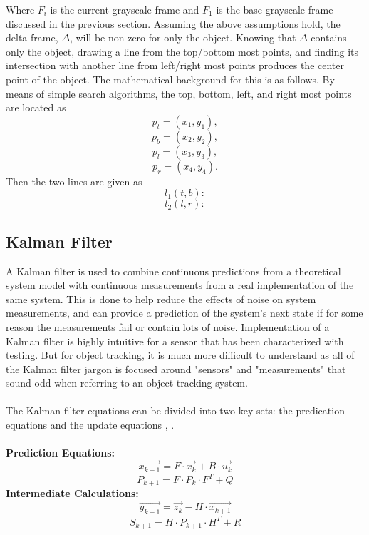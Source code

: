 \documentclass[12pt]{article} %
\begin{document}
Where $F_i$ is the current grayscale frame and $F_1$ is the base grayscale frame discussed in the previous section. Assuming the above assumptions hold, the delta frame, $\Delta$, will be non-zero for only the object. Knowing that $\Delta$ contains only the object, drawing a line from the top/bottom most points, and finding its intersection with another line from left/right most points produces the center point of the object. The mathematical background for this is as follows. By means of simple search algorithms, the top, bottom, left, and right most points are located as
\[
p_t = (x_1, y_1) ,
\]
\[
p_b = (x_2, y_2) ,
\]
\[
p_l = (x_3, y_3) ,
\]
\[
p_r = (x_4, y_4) .
\]
Then the two lines are given as 
\[
l_1(t,b):
\]
\[
l_2(l,r):
\]
\subsection{Kalman Filter}
A Kalman filter is used to combine continuous predictions from a theoretical system model with continuous measurements from a real implementation of the same system. This is done to help reduce the effects of noise on system measurements, and can provide a prediction of the system's next state if for some reason the measurements fail or contain lots of noise. Implementation of a Kalman filter is highly intuitive for a sensor that has been characterized with testing. But for object tracking, it is much more difficult to understand as all of the Kalman filter jargon is focused around "sensors" and "measurements" that sound odd when referring to an object tracking system. \\\\
The Kalman filter equations can be divided into two key sets: the predication equations and the update equations \cite{4}, \cite{12}.\\\\
\textbf{Prediction Equations:}
\begin{equation}
\vec{x_{k+1}} = F \cdot \vec{x_k} + B \cdot \vec{u_k}
\label{eq:firstkalman}
\end{equation}
\begin{equation}
P_{k+1} = F \cdot P_k \cdot F^T + Q
\end{equation}
\textbf{Intermediate Calculations:}
\begin{equation}
\vec{y_{k+1}} = \vec{z_k} - H \cdot \vec{x_{k+1}}
\end{equation}
\begin{equation}
S_{k+1} = H \cdot P_{k+1} \cdot H^T + R
\end{equation}
\end{document}
